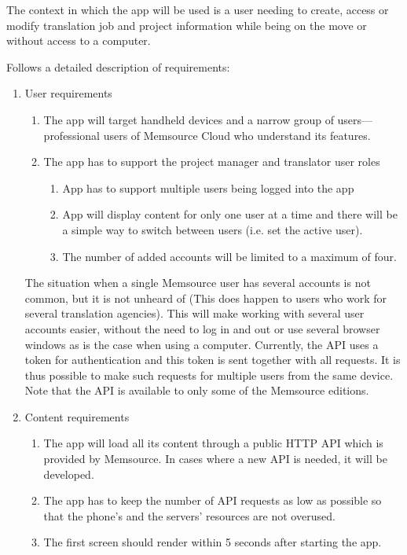 The context in which the app will be used is a user needing to create, access or modify translation job and project information while being on the move or without access to a computer.

Follows a detailed description of requirements:


\begin{enumerate}
	\item User requirements
	\begin{enumerate}[label*=\arabic*.]
		\item The app will target handheld devices and a narrow group of users---professional users of Memsource Cloud who understand its features. 
		\item The app has to support the project manager and translator user roles 
		\begin{enumerate}[label*=\arabic*.]
			\item App has to support multiple users being logged into the app
			\item App will display content for only one user at a time and there will be a simple way to switch between users (i.e. set the active user).
			\item The number of added accounts will be limited to a maximum of four.
		\end{enumerate}
	\end{enumerate}
	
	The situation when a single Memsource user has several accounts is not common, but it is not unheard of (This does happen to users who work for several translation agencies). This will make working with several user accounts easier, without the need to log in and out or use several browser windows as is the case when using a computer. Currently, the API uses a token for authentication and this token is sent together with all requests. It is thus possible to make such requests for multiple users from the same device. Note that the API is available to only some of the Memsource editions.  
	
	\item Content requirements
	\begin{enumerate}[label*=\arabic*.]
		\item The app will load all its content through a public HTTP API which is provided by Memsource. In cases where a new API is needed, it will be developed.
		\item The app has to keep the number of API requests as low as possible so that the phone's and the servers' resources are not overused.
		\item The first screen should render within 5 seconds after starting the app.
	\end{enumerate}
	

\end{enumerate}
